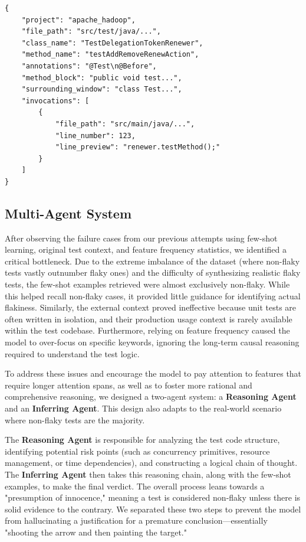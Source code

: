 \documentclass{article}
\begin{document}
\begin{lstlisting}[style=mystyle, caption=Example Context Information, label=lst:json_example]
{
    "project": "apache_hadoop",
    "file_path": "src/test/java/...",
    "class_name": "TestDelegationTokenRenewer",
    "method_name": "testAddRemoveRenewAction",
    "annotations": "@Test\n@Before",          
    "method_block": "public void test...",     
    "surrounding_window": "class Test...",    
    "invocations": [                           
        {
            "file_path": "src/main/java/...",
            "line_number": 123,
            "line_preview": "renewer.testMethod();"
        }
    ]
}
\end{lstlisting}

\subsection{Multi-Agent System}

After observing the failure cases from our previous attempts using few-shot learning, original test context, and feature frequency statistics, we identified a critical bottleneck. Due to the extreme imbalance of the dataset (where non-flaky tests vastly outnumber flaky ones) and the difficulty of synthesizing realistic flaky tests, the few-shot examples retrieved were almost exclusively non-flaky. While this helped recall non-flaky cases, it provided little guidance for identifying actual flakiness. Similarly, the external context proved ineffective because unit tests are often written in isolation, and their production usage context is rarely available within the test codebase. Furthermore, relying on feature frequency caused the model to over-focus on specific keywords, ignoring the long-term causal reasoning required to understand the test logic.

To address these issues and encourage the model to pay attention to features that require longer attention spans, as well as to foster more rational and comprehensive reasoning, we designed a two-agent system: a \textbf{Reasoning Agent} and an \textbf{Inferring Agent}. This design also adapts to the real-world scenario where non-flaky tests are the majority.

The \textbf{Reasoning Agent} is responsible for analyzing the test code structure, identifying potential risk points (such as concurrency primitives, resource management, or time dependencies), and constructing a logical chain of thought. The \textbf{Inferring Agent} then takes this reasoning chain, along with the few-shot examples, to make the final verdict. The overall process leans towards a "presumption of innocence," meaning a test is considered non-flaky unless there is solid evidence to the contrary. We separated these two steps to prevent the model from hallucinating a justification for a premature conclusion—essentially "shooting the arrow and then painting the target."
\end{document}
